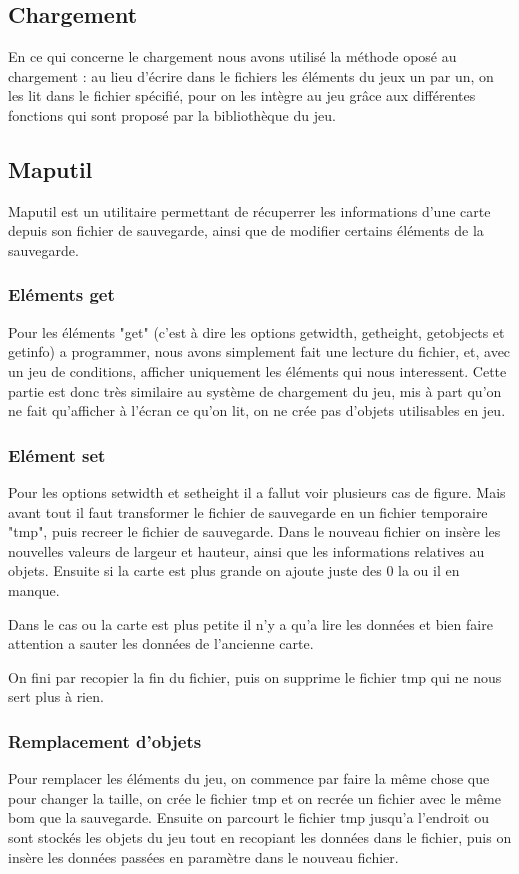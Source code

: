 \documentclass{article}
\begin{document}
\subsection{Chargement}
En ce qui concerne le chargement nous avons utilisé la méthode oposé au chargement : au lieu d'écrire dans le fichiers les éléments du jeux un par un, on les lit dans le fichier spécifié, pour on les intègre au jeu grâce aux différentes fonctions qui sont proposé par la bibliothèque du jeu.

\subsection{Maputil}
Maputil est un utilitaire permettant de récuperrer les informations d'une carte depuis son fichier de sauvegarde, ainsi que de modifier certains éléments de la sauvegarde.

\subsubsection{Eléments get}
Pour les éléments "get" (c'est à dire les options getwidth, getheight, getobjects et getinfo) a programmer, nous avons simplement fait une lecture du fichier, et, avec un jeu de conditions, afficher uniquement les éléments qui nous interessent. Cette partie est donc très similaire au système de chargement du jeu, mis à part qu'on ne fait qu'afficher à l'écran ce qu'on lit, on ne crée pas d'objets utilisables en jeu.

\subsubsection{Elément set}
Pour les options setwidth et setheight il a fallut voir plusieurs cas de figure. Mais avant tout il faut transformer le fichier de sauvegarde en un fichier temporaire "tmp", puis recreer le fichier de sauvegarde. Dans le nouveau fichier on insère les nouvelles valeurs de largeur et hauteur, ainsi que les informations relatives au objets. Ensuite si la carte est plus grande on ajoute juste des 0 la ou il en manque.

Dans le cas ou la carte est plus petite il n'y a qu'a lire les données et bien faire attention a sauter les données de l'ancienne carte.

On fini par recopier la fin du fichier, puis on supprime le fichier tmp qui ne nous sert plus à rien.

\subsubsection{Remplacement d'objets}
Pour remplacer les éléments du jeu, on commence par faire la même chose que pour changer la taille, on crée le fichier tmp et on recrée un fichier avec le même bom que la sauvegarde. Ensuite on parcourt le fichier tmp jusqu'a l'endroit ou sont stockés les objets du jeu tout en recopiant les données dans le fichier, puis on insère les données passées en paramètre dans le nouveau fichier.
\end{document}
